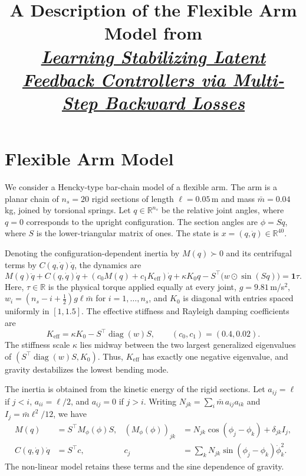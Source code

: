 \documentclass[10pt]{article}
\title{A Description of the Flexible Arm Model from\\ \href{https://arxiv.org/abs/2610.40931}{\textit{Learning Stabilizing Latent Feedback Controllers via Multi-Step Backward Losses}}}
\author{}
\date{}
\begin{document}
\maketitle
\vspace{-2em}

\section{Flexible Arm Model}

We consider a Hencky-type bar-chain model of a flexible arm.
The arm is a planar chain of $n_s=20$ rigid sections of length
$\ell=0.05$\,m and mass $\bar m=0.04$\,kg, joined by torsional springs.
Let $q\in\mathbb R^{n_s}$ be the relative joint angles, where $q=0$
corresponds to the upright configuration. The section angles are
$\phi=Sq$, where $S$ is the lower-triangular matrix of ones.
The state is $x=(q,\dot q)\in\mathbb R^{40}$.

Denoting the configuration-dependent inertia by $M(q)\succ0$ and its
centrifugal terms by $C(q,\dot q)\dot q$, the dynamics are
\begin{equation}
 M(q)\ddot q+C(q,\dot q)\dot q
 +(c_0M(q)+c_1K_{\mathrm{eff}})\dot q
 +\kappa K_0q-S^\top\bigl(w\odot\sin(Sq)\bigr)
 =\bm 1\tau.
 \label{eq:arm}
\end{equation}
Here, $\tau\in\mathbb R$ is the physical torque applied equally at every
joint, $g=9.81$\,m/s$^2$,
$w_i=(n_s-i+\tfrac12)g\ell\bar m$ for $i=1,\ldots,n_s$,
and $K_0$ is diagonal with entries spaced uniformly in $[1,1.5]$.
The effective stiffness and Rayleigh damping coefficients are
\[
 K_{\mathrm{eff}}=\kappa K_0-S^\top\operatorname{diag}(w)S,
 \qquad (c_0,c_1)=(0.4,0.02).
\]
The stiffness scale $\kappa$ lies midway between the two largest
generalized eigenvalues of $(S^\top\operatorname{diag}(w)S,K_0)$.
Thus, $K_{\mathrm{eff}}$ has exactly one negative eigenvalue, and gravity
destabilizes the lowest bending mode.

The inertia is obtained from the kinetic energy of the rigid sections.
Let $a_{ij}=\ell$ if $j<i$, $a_{ii}=\ell/2$, and $a_{ij}=0$ if $j>i$.
Writing $N_{jk}=\sum_i\bar m\,a_{ij}a_{ik}$ and
$I_j=\bar m\ell^2/12$, we have
\begin{align}
 M(q)&=S^\top M_\phi(\phi)S,
 & (M_\phi(\phi))_{jk}&=N_{jk}\cos(\phi_j-\phi_k)+\delta_{jk}I_j,\\
 C(q,\dot q)\dot q&=S^\top c,
 & c_j&=\sum_k N_{jk}\sin(\phi_j-\phi_k)\dot\phi_k^2.
\end{align}
The non-linear model retains these terms and the sine dependence of gravity.
\end{document}
